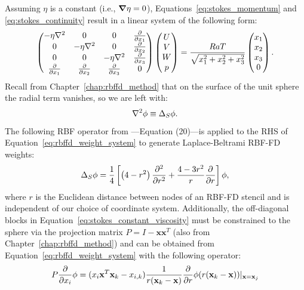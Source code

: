 Assuming $\eta$ is a constant (i.e., $\mbox{\boldmath$ \nabla $} \eta = 0$), Equations~\ref{eq:stokes_momentum} and \ref{eq:stokes_continuity} result in a linear system of the following form:
\begin{align}
\begin{pmatrix}
-\eta \Laplacian & 0 & 0 & \pd{}{x_1} \\ 
0 & -\eta \Laplacian & 0 & \pd{}{x_2} \\ 
0 & 0 & -\eta \Laplacian & \pd{}{x_3} \\ 
\pd{}{x_1} & \pd{}{x_2} & \pd{}{x_3} & 0 \\
\end{pmatrix} \begin{pmatrix}
U \\ V \\ W \\ p 
\end{pmatrix} = \frac{RaT}{\sqrt{x_1^2 + x_2^2 + x_3^2}}\begin{pmatrix} x_1 \\ x_2 \\ x_3 \\ 0\end{pmatrix}.
\label{eq:stokes_constant_viscosity}
\end{align} 
Recall from Chapter~\ref{chap:rbffd_method} that on the surface of the unit sphere the radial term vanishes, so we are left with:
\begin{align*}
\nabla^2 \phi   \equiv \Delta_S \phi. 
\end{align*}
The following RBF operator from \cite{WrightFlyerYuen10}---Equation (20)---is applied to the RHS of Equation~\ref{eq:rbffd_weight_system} to generate Laplace-Beltrami RBF-FD weights: 
\begin{align*} 
\Delta_S \phi = \frac{1}{4} \left[ \left(4-r^2\right) \frac{\partial^2 }{\partial r^2} + \frac{4-3r^2}{r} \frac{\partial }{\partial r} \right] \phi,
\end{align*} 
where $r$ is the Euclidean distance between nodes of an RBF-FD stencil and is independent of our choice of coordinate system. 
Additionally, the off-diagonal blocks in Equation~\ref{eq:stokes_constant_viscosity} must be constrained to the sphere via the projection matrix $P = I - \mathbf{x} \mathbf{x}^T$ (also from Chapter~\ref{chap:rbffd_method}) and can be obtained from Equation~\ref{eq:rbffd_weight_system} with the following operator:  
\begin{align*} 
P\frac{\partial }{\partial x_i} \phi = ( x_i \mathbf{x}^T \mathbf{x}_k - x_{i,k}) \frac{1}{r(\mathbf{x}_k - \mathbf{x})}  \frac{\partial }{\partial r} \phi(r(\mathbf{x}_k - \mathbf{x})) |_{\mathbf{x}=\mathbf{x}_j} 
\end{align*}
